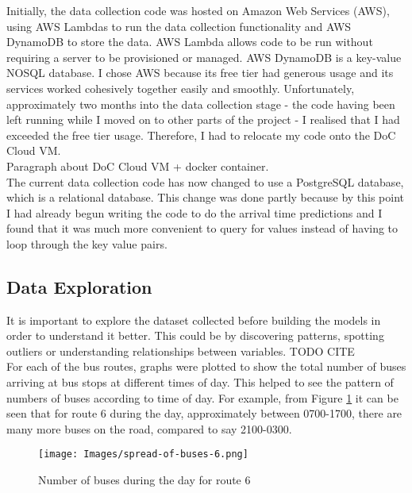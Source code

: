 Initially, the data collection code was hosted on Amazon Web Services (AWS), using AWS Lambdas to run the data collection functionality and AWS DynamoDB to store the data. AWS Lambda allows code to be run without requiring a server to be provisioned or managed. AWS DynamoDB is a key-value NOSQL database. I chose AWS because its free tier had generous usage and its services worked cohesively together easily and smoothly. Unfortunately, approximately two months into the data collection stage - the code having been left running while I moved on to other parts of the project - I realised that I had exceeded the free tier usage. Therefore, I had to relocate my code onto the DoC Cloud VM.  \\

Paragraph about DoC Cloud VM + docker container. \\

The current data collection code has now changed to use a PostgreSQL database, which is a relational database. This change was done partly because by this point I had already begun writing the code to do the arrival time predictions and I found that it was much more convenient to query for values instead of having to loop through the key value pairs. 

\subsection{Data Exploration}

It is important to explore the dataset collected before building the models in order to understand it better. This could be by discovering patterns, spotting outliers or understanding relationships between variables. TODO CITE \\

For each of the bus routes, graphs were plotted to show the total number of buses arriving at bus stops at different times of day. This helped to see the pattern of numbers of buses according to time of day. For example, from Figure \ref{fig:spread-of-buses-over-day-6} it can be seen that for route 6 during the day, approximately between 0700-1700, there are many more buses on the road, compared to say 2100-0300. 

\begin{figure}[H]
\begin{center}
    \texttt{[image: Images/spread-of-buses-6.png]}
    \caption{Number of buses during the day for route 6}
    \label{fig:spread-of-buses-over-day-6}
\end{center}
\end{figure}

